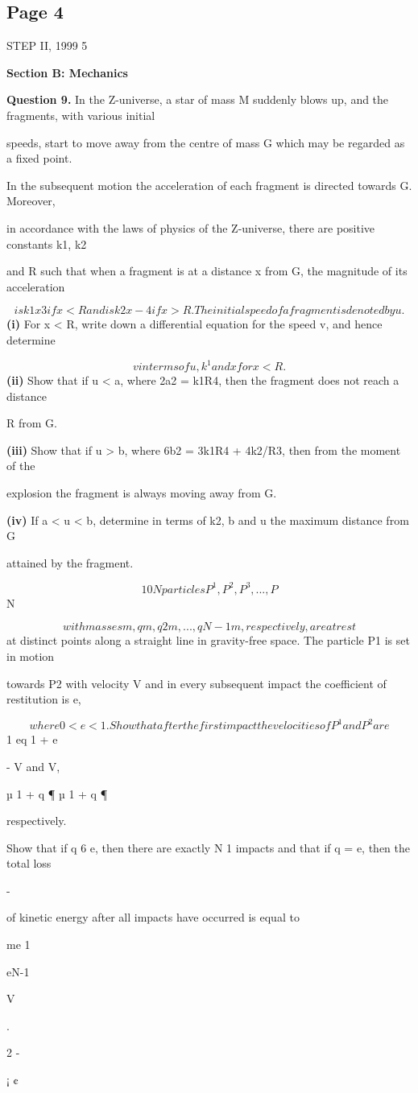\documentclass[12pt]{article}
\begin{document}
\subsection*{Page 4}
\begin{flushleft}
STEP II, 1999 5\par
\bigskip\textbf{Section B: Mechanics}\par
\bigskip\textbf{Question 9.} In the Z-universe, a star of mass M suddenly blows up, and the fragments, with various initial\par
speeds, start to move away from the centre of mass G which may be regarded as a fixed point.\par
In the subsequent motion the acceleration of each fragment is directed towards G. Moreover,\par
in accordance with the laws of physics of the Z-universe, there are positive constants k1, k2\par
and R such that when a fragment is at a distance x from G, the magnitude of its acceleration\par
\[is k1x3 if x < R and is k2x -4 if x > R. The initial speed of a fragment is denoted by u.\]
\textbf{(i)} For x < R, write down a differential equation for the speed v, and hence determine\par
\[v in terms of u, k^1 and x for x < R.\]
\textbf{(ii)} Show that if u < a, where 2a2 = k1R4, then the fragment does not reach a distance\par
R from G.\par
\textbf{(iii)} Show that if u > b, where 6b2 = 3k1R4 + 4k2/R3, then from the moment of the\par
explosion the fragment is always moving away from G.\par
\textbf{(iv)} If a < u < b, determine in terms of k2, b and u the maximum distance from G\par
attained by the fragment.\par
\[10 N particles P^1, P^2, P^3, . . ., P\]
N\par
\[with masses m, qm, q2m, . . . , qN-1m, respectively, are at rest\]
at distinct points along a straight line in gravity-free space. The particle P1 is set in motion\par
towards P2 with velocity V and in every subsequent impact the coefficient of restitution is e,\par
\[where 0 < e < 1. Show that after the first impact the velocities of P^1 and P^2 are\]
1 eq 1 + e\par
- V and V,\par
µ 1 + q ¶ µ 1 + q ¶\par
respectively.\par
Show that if q 6 e, then there are exactly N 1 impacts and that if q = e, then the total loss\par
-\par
of kinetic energy after all impacts have occurred is equal to\par
me 1\par
eN-1\par
V\par
.\par
2 -\par
¡ ¢\par
\end{flushleft}
\end{document}
